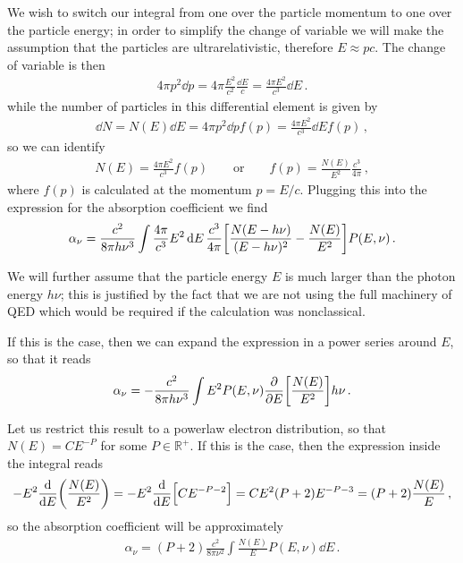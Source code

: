 \documentclass[main.tex]{subfiles}
\begin{document}

We wish to switch our integral from one over the particle momentum to one over the particle energy; in order to simplify the change of variable we will make the assumption that the particles are ultrarelativistic, therefore \(E \approx p c\). The change of variable is then 
%
\begin{align}
4 \pi p^2 \dd{p}=  4 \pi \frac{E^2}{c^2} \frac{\dd{E}}{c} = \frac{4 \pi E^2}{c^3} \dd{E}
\,.
\end{align}
%
while the number of particles in this differential element is given by 
%
\begin{align}
\dd{N} = N(E) \dd{E} = 4 \pi p^2 \dd{p} f(p) = \frac{4 \pi E^2}{c^3} \dd{E} f(p)
\,,
\end{align}
%
so we can identify 
%
\begin{align}
N(E) = \frac{4 \pi E^2}{c^3} f(p)
\qquad \text{or} \qquad
f(p) = \frac{N(E)}{E^2} \frac{c^3}{4 \pi }
\,,
\end{align}
%
where \(f(p)\) is calculated at the momentum \(p = E /c\).  
Plugging this into the expression for the absorption coefficient we find 
%
\begin{align}
\alpha _\nu = \frac{c^2}{8 \pi h \nu^3} \int \frac{4 \pi }{c^3} E^2 \dd{E} \frac{c^3}{4 \pi } \qty[\frac{N(E - h \nu )}{(E - h \nu )^2} - \frac{N(E)}{E^2}] P (E, \nu )
\,.
\end{align}

We will further assume that the particle energy \(E\) is much larger than the photon energy \(h \nu \); this is justified by the fact that we are not using the full machinery of QED which would be required if the calculation was nonclassical.

If this is the case, then we can expand the expression in a power series around \(E\), so that it reads 
%
\begin{align}
\alpha _\nu  = - \frac{c^2}{8 \pi h \nu^3} \int E^2 P(E, \nu ) \pdv{}{E} \qty[ \frac{N(E)}{E^2}] h \nu 
\,.
\end{align}

Let us restrict this result to a powerlaw electron distribution, so that \(N(E) = C E^{-P}\) for some \(P \in \mathbb{R}^{+}\). 
If this is the case, then the expression inside the integral reads 
%
\begin{align}
- E^2 \dv{}{E} \qty(\frac{N(E)}{E^2})
= - E^2 \dv{}{E} \qty[C E^{-P-2}]
= C E^2 (P+2) E^{-P-3} = (P+2) \frac{N(E)}{E}
\,,
\end{align}
%
so the absorption coefficient will be approximately 
%
\begin{align}
\alpha _\nu = (P+2) \frac{c^2}{8 \pi \nu^2} \int \frac{N(E)}{E} P(E, \nu ) \dd{E} 
\,.
\end{align}
\end{document}
